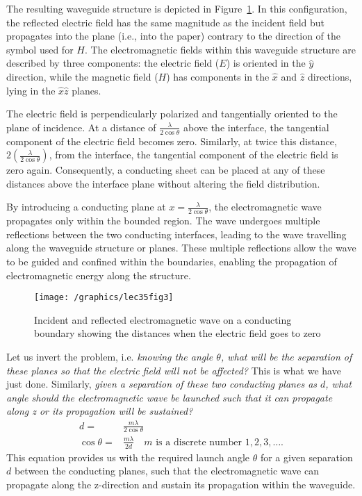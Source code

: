 The resulting waveguide structure is depicted in Figure~\ref{fig:lec35fig3}. In this configuration, the reflected electric field has the same magnitude as the incident field but propagates into the plane (i.e., into the paper) contrary to the direction of the symbol used for $H$. The electromagnetic fields within this waveguide structure are described by three components: the electric field ($E$) is oriented in the $\hat{y}$ direction, while the magnetic field ($H$) has components in the $\hat{x}$ and $\hat{z}$ directions, lying in the $\hat{x}\hat{z}$ planes.

The electric field is perpendicularly polarized and tangentially oriented to the plane of incidence. At a distance of $\frac{\lambda}{2\cos\theta}$ above the interface, the tangential component of the electric field becomes zero. Similarly, at twice this distance, $2\left(\frac{\lambda}{2\cos\theta}\right)$, from the interface, the tangential component of the electric field is zero again. Consequently, a conducting sheet can be placed at any of these distances above the interface plane without altering the field distribution.

By introducing a conducting plane at $x=\frac{\lambda}{2\cos\theta}$, the electromagnetic wave propagates only within the bounded region. The wave undergoes multiple reflections between the two conducting interfaces, leading to the wave travelling along the waveguide structure or planes. These multiple reflections allow the wave to be guided and confined within the boundaries, enabling the propagation of electromagnetic energy along the structure.
\begin{figure}[h]
\centering
\texttt{[image: /graphics/lec35fig3]}
\caption{Incident and reflected electromagnetic wave on a conducting boundary showing the distances when the electric field goes to zero}
\label{fig:lec35fig3}
\end{figure}

Let us invert the problem, i.e. \emph{knowing the angle $\theta$, what will be the separation of these planes so that the electric field will not be affected?} This is what we have just done. Similarly, \emph{given a separation of these two conducting planes as $d$, what angle should the electromagnetic wave be launched such that it can propagate along z or its propagation will be sustained?} 
\begin{align*}
d =& \frac{m\lambda}{2\cos\theta}\\
\cos\theta =& \frac{m\lambda}{2d}\quad\text{$m$ is a discrete number $1, 2, 3, \ldots$.}
\end{align*}
This equation provides us with the required launch angle $\theta$ for a given separation $d$ between the conducting planes, such that the electromagnetic wave can propagate along the z-direction and sustain its propagation within the waveguide.

